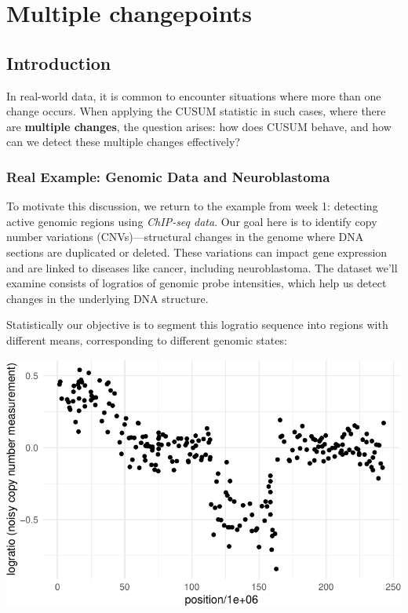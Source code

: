 \documentclass[
  letterpaper,
  DIV=11,
  numbers=noendperiod]{scrreprt}
\begin{document}

\chapter{Multiple changepoints}\label{multiple-changepoints}

\section{Introduction}\label{introduction}

In real-world data, it is common to encounter situations where more than
one change occurs. When applying the CUSUM statistic in such cases,
where there are \textbf{multiple changes}, the question arises: how does
CUSUM behave, and how can we detect these multiple changes effectively?

\subsection{Real Example: Genomic Data and
Neuroblastoma}\label{real-example-genomic-data-and-neuroblastoma}

To motivate this discussion, we return to the example from week 1:
detecting active genomic regions using \emph{ChIP-seq data}. Our goal
here is to identify copy number variations (CNVs)---structural changes
in the genome where DNA sections are duplicated or deleted. These
variations can impact gene expression and are linked to diseases like
cancer, including neuroblastoma. The dataset we'll examine consists of
logratios of genomic probe intensities, which help us detect changes in
the underlying DNA structure.

Statistically our objective is to segment this logratio sequence into
regions with different means, corresponding to different genomic states:

\includegraphics{3_multiple_changes_files/figure-pdf/unnamed-chunk-2-1.pdf}
\end{document}
